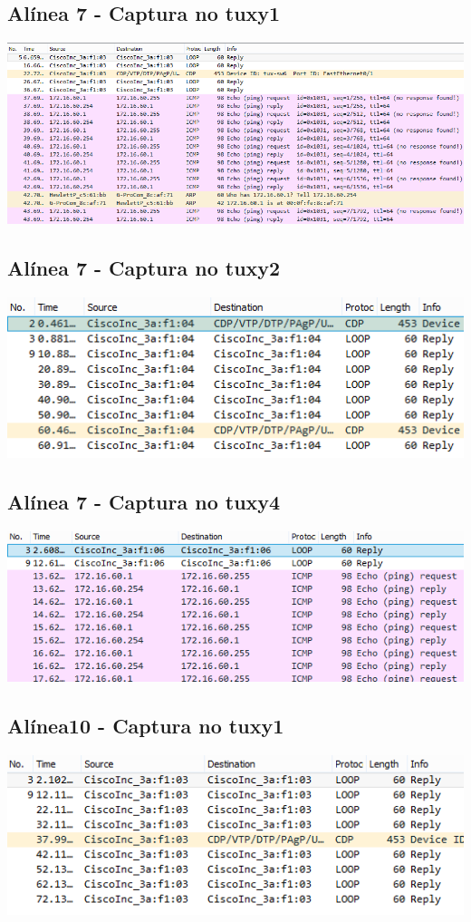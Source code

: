 \documentclass[11pt,a4paper,reqno]{report}
\numberwithin{equation}{section}
\begin{document}
\begin{appendices}
\subsection{Alínea 7 - Captura no tuxy1}
\includegraphics[width=18cm]{ex2_a7_tux1.png}
\subsection{Alínea 7 - Captura no tuxy2}
\label{ex2_tux1ping_tux2}
\includegraphics[width=18cm]{ex2_a7_tux2.png}
\subsection{Alínea 7 - Captura no tuxy4}
\label{ex2_tux1ping_tux4}
\includegraphics[width=18cm]{ex2_a7_tux4.png}

\subsection{Alínea10 - Captura no tuxy1}
\includegraphics[width=18cm]{ex2_a10_tux1.png}

\end{appendices}
\end{document}
